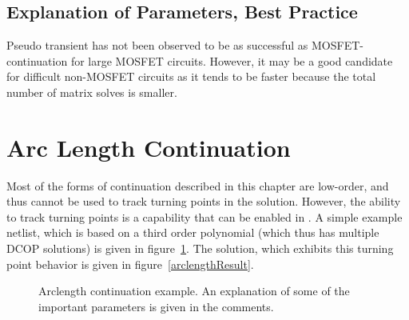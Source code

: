 \subsection{Explanation of Parameters, Best Practice}

Pseudo transient has not been observed to be as successful as
MOSFET-continuation for large MOSFET circuits. However, it may be a good
candidate for difficult non-MOSFET circuits as it tends to be faster
because the total number of matrix solves is smaller.

\newpage 
\section{Arc Length Continuation}
\label{continuation_arclength} 
Most of the forms of continuation described in this chapter are low-order, and thus
cannot be used to track turning points in the solution.  However, the ability to track
turning points is a capability that can be enabled in \Xyce{}.  A simple example netlist,
which is based on a third order polynomial (which thus has multiple DCOP solutions) is
given in figure~\ref{arclength_netlist}.  The solution, which exhibits this turning
point behavior is given in figure~\ref{arclengthResult}.

\begin{figure}[htbp]
\begin{centering}
\caption [Arclength continuation example.]{Arclength continuation example.  An explanation of some of the important parameters is given in the comments.  \label{arclength_netlist}} 
\end{centering}
\end{figure}


